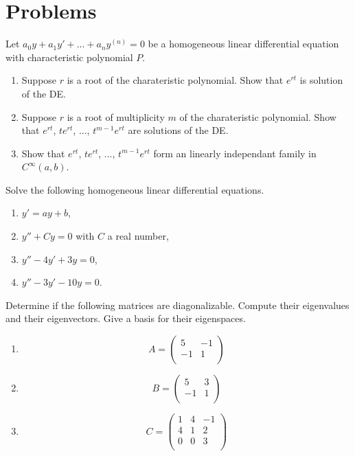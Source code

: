 \section{Problems}

\begin{Pb}
Let $a_0y + a_1 y' + ... + a_n y^{(n)}= 0$ be a homogeneous linear differential equation with characteristic polynomial $P$.  
\begin{enumerate}
\item Suppose $r$ is a root of the charateristic polynomial. Show that $e^{rt}$ is solution of the DE.
\item Suppose $r$ is a root of multiplicity $m$ of the charateristic polynomial. Show that $e^{rt}$, $te^{rt}$, ..., $t^{m-1}e^{rt}$ are solutions of the DE.
\item Show that $e^{rt}$, $te^{rt}$, ..., $t^{m-1}e^{rt}$ form an linearly independant family in $C^\infty(a,b)$.
\end{enumerate}
\end{Pb}

\begin{Pb}
Solve the following homogeneous linear differential equations.  
\begin{enumerate}
\item $y' = ay +b$,
\item $y''+ C y =0$ with $C$ a real number,
\item $y'' - 4y'+ 3y= 0$,
\item $y'' - 3y'- 10y= 0$.
\end{enumerate}
\end{Pb}

\begin{Pb}
Determine if the following matrices are diagonalizable. Compute their eigenvalues and their eigenvectors. Give a basis for their eigenspaces.   
\begin{enumerate}
\item \[A= \begin{pmatrix}
5 & -1  \\
-1 & 1  \\
\end{pmatrix}\]
\item \[B= \begin{pmatrix}
5 & 3  \\
-1 & 1  \\
\end{pmatrix}\]
\item \[C= \begin{pmatrix}
1 & 4 & -1 \\
4 & 1 &  2 \\
0 & 0 & 3\\
\end{pmatrix}\]	
\end{enumerate}
\end{Pb}

